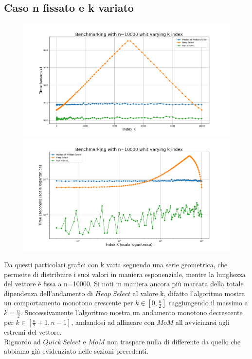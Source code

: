 \documentclass[a4paper]{article}
\begin{document}
\subsection{Caso n fissato e k variato}
\begin{figure}[h]
    \centering
    \includegraphics[width=.83\textwidth]{graphs/n_fixed_n.png}
    \includegraphics[width=.83\textwidth]{graphs/n_fixed_2xlog.png}
\end{figure}
Da questi particolari grafici con k varia seguendo una serie geometrica, che permette di distribuire i suoi valori in maniera esponenziale, mentre la lunghezza del vettore è fissa a n=10000. Si noti in maniera ancora più marcata della totale dipendenza dell'andamento di $Heap\ Select$ al valore k, difatto l'algoritmo mostra un comportamento monotono crescente per $k\in[0,\frac{n}{2}]$ raggiungendo il massimo a $k=\frac{n}{2}$. 
Successivamente l'algoritmo mostra un andamento monotono decrescente per $k\in[\frac{n}{2}+1,n-1]$, andandosi ad allineare con $MoM$ all avvicinarsi agli estremi del vettore. \\
Riguardo ad $Quick\ Select$ e $MoM$ non traspare nulla di differente da quello che abbiamo già evidenziato nelle sezioni precedenti.\\
\newpage
\end{document}
